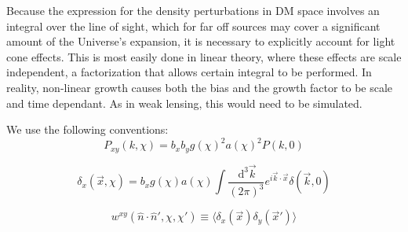 \documentclass[onecolumn,prd,nofootinbib]{revtex4-1}
\newcommand{\ud}{\,\mathrm{d}}
\begin{document}
Because the expression for the density perturbations in DM space involves an
integral over the line of sight, which for far off sources may cover a
significant amount of the Universe's expansion, it is necessary to explicitly
account for light cone effects. This is most easily done in linear theory,
where these effects are scale independent, a factorization that allows certain
integral to be performed. In reality, non-linear growth causes both the bias
and the growth factor to be scale and time dependant. As in weak lensing, this
would need to be simulated.

We use the following conventions:
\begin{equation}
    P_{xy}(k, \chi) = b_x b_y g(\chi)^2 a(\chi)^2 P(k, 0)
\end{equation}

\begin{equation}
    \delta_x(\vec x, \chi) =  b_x g(\chi) a(\chi) \int\frac{\ud^3\vec k}{(2 \pi)^3}
        e^{i\vec k \cdot \vec x} \delta(\vec k, 0)
\end{equation}

\begin{equation}
    w^{xy}(\hat n \cdot \hat n', \chi, \chi')
    \equiv \langle \delta_x(\vec x) \delta_y(\vec x') \rangle
\end{equation}
\end{document}
